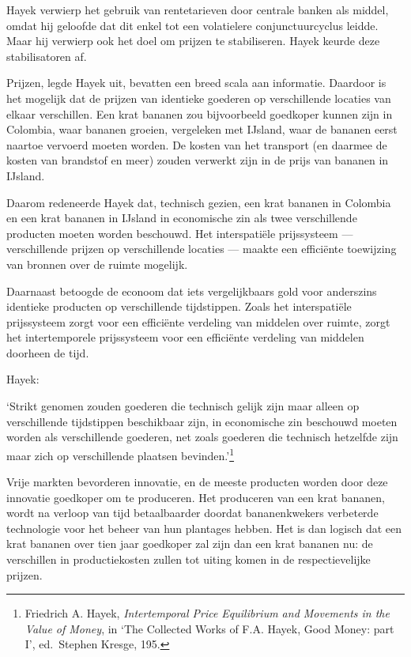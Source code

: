 \documentclass[
  a5paper,
  smalldemyvopaper,11pt,twoside,onecolumn,openright,extrafontsizes,
hidelinks]{memoir}
\renewenvironment{quote}%
               {\list{}{\rightmargin=.3cm\leftmargin=.3cm}%
                \itshape \item[]}%
               {\endlist}
\begin{document}
Hayek verwierp het gebruik van rentetarieven door centrale banken als
middel, omdat hij geloofde dat dit enkel tot een volatielere
conjunctuurcyclus leidde. Maar hij verwierp ook het doel om prijzen te
stabiliseren. Hayek keurde deze stabilisatoren af.

Prijzen, legde Hayek uit, bevatten een breed scala aan informatie.
Daardoor is het mogelijk dat de prijzen van identieke goederen op
verschillende locaties van elkaar verschillen. Een krat bananen zou
bijvoorbeeld goedkoper kunnen zijn in Colombia, waar bananen groeien,
vergeleken met IJsland, waar de bananen eerst naartoe vervoerd moeten
worden. De kosten van het transport (en daarmee de kosten van brandstof
en meer) zouden verwerkt zijn in de prijs van bananen in IJsland.

Daarom redeneerde Hayek dat, technisch gezien, een krat bananen in
Colombia en een krat bananen in IJsland in economische zin als twee
verschillende producten moeten worden beschouwd. Het interspatiële
prijssysteem --- verschillende prijzen op verschillende locaties ---
maakte een efficiënte toewijzing van bronnen over de ruimte mogelijk.

Daarnaast betoogde de econoom dat iets vergelijkbaars gold voor
anderszins identieke producten op verschillende tijdstippen. Zoals het
interspatiële prijssysteem zorgt voor een efficiënte verdeling van
middelen over ruimte, zorgt het intertemporele prijssysteem voor een
efficiënte verdeling van middelen doorheen de tijd.

Hayek:

\begin{quote}
`Strikt genomen zouden goederen die technisch gelijk zijn maar alleen op
verschillende tijdstippen beschikbaar zijn, in economische zin beschouwd
moeten worden als verschillende goederen, net zoals goederen die
technisch hetzelfde zijn maar zich op verschillende plaatsen
bevinden.'\footnote{\hspace{0pt}Friedrich A. Hayek, \emph{Intertemporal
  Price Equilibrium and Movements in the Value of Money}, in `The
  Collected Works of F.A. Hayek, Good Money: part I', ed.~Stephen
  Kresge, 195.}
\end{quote}

Vrije markten bevorderen innovatie, en de meeste producten worden door
deze innovatie goedkoper om te produceren. Het produceren van een krat
bananen, wordt na verloop van tijd betaalbaarder doordat bananenkwekers
verbeterde technologie voor het beheer van hun plantages hebben. Het is
dan logisch dat een krat bananen over tien jaar goedkoper zal zijn dan
een krat bananen nu: de verschillen in productiekosten zullen tot uiting
komen in de respectievelijke prijzen.
\end{document}
